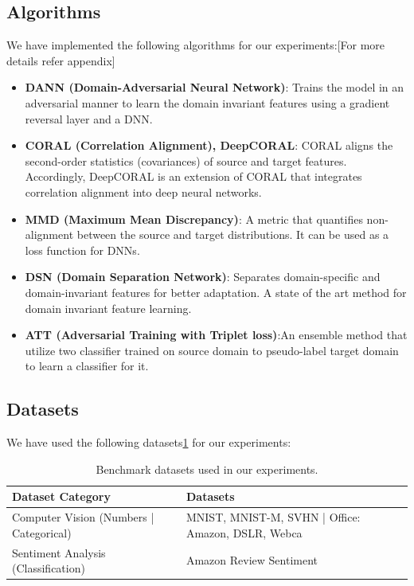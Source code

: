 \documentclass{article}
\begin{document}
\subsection{Algorithms}
We have implemented the following algorithms for our experiments:[For more details refer appendix]
\begin{itemize}
  \item \textbf{DANN (Domain-Adversarial Neural Network)}\cite{ganin2016domainadversarialtrainingneuralnetworks}: Trains the model in an adversarial manner to learn the domain invariant features using a gradient reversal layer and a DNN.
  \item \textbf{CORAL (Correlation Alignment), DeepCORAL}\cite{Coral,DeepCoral}: CORAL aligns the second-order statistics (covariances) of source and target features. Accordingly, DeepCORAL is an extension of CORAL that integrates correlation alignment into deep neural networks.
  \item \textbf{MMD (Maximum Mean Discrepancy)}\cite{sutherland2017generative}: A metric that quantifies non-alignment between the source and target distributions. It can be used as a loss function for DNNs.
  \item \textbf{DSN (Domain Separation Network)}\cite{DSN}: Separates domain-specific and domain-invariant features for better adaptation. A state of the art method for domain invariant feature learning.
  \item \textbf{ATT (Adversarial Training with Triplet loss)}\cite{pmlr-v70-saito17a}:An ensemble method that utilize two classifier trained on source domain to pseudo-label target domain to learn a classifier for it.
\end{itemize}

\subsection{Datasets}
We have used the following datasets\ref{tab:datasets} for our experiments:
\begin{table}
  \centering
  \caption{Benchmark datasets used in our experiments.}
  \label{tab:datasets}
  \begin{tabular}{ll}
      \toprule
      \textbf{Dataset Category} & \textbf{Datasets} \\
      \midrule
      Computer Vision (Numbers | Categorical)     & MNIST, MNIST-M, SVHN | Office: Amazon, DSLR, Webca \\
      Sentiment Analysis (Classification)  & Amazon Review Sentiment \\
      \bottomrule
  \end{tabular}
\end{table}
\end{document}
